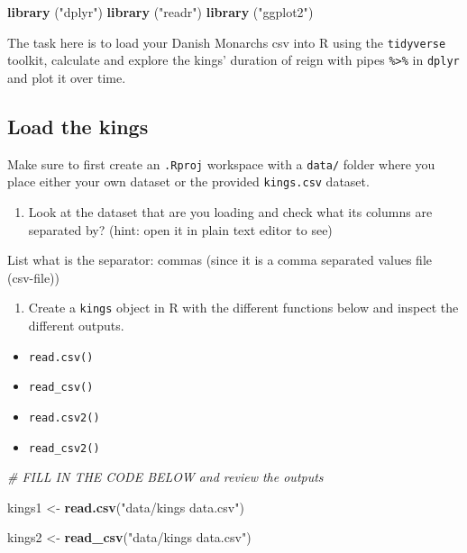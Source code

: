\documentclass[
]{article}
\newenvironment{Shaded}{\begin{snugshade}}{\end{snugshade}}
\newcommand{\CommentTok}[1]{\textcolor[rgb]{0.56,0.35,0.01}{\textit{#1}}}
\newcommand{\FunctionTok}[1]{\textcolor[rgb]{0.13,0.29,0.53}{\textbf{#1}}}
\newcommand{\NormalTok}[1]{#1}
\newcommand{\OtherTok}[1]{\textcolor[rgb]{0.56,0.35,0.01}{#1}}
\newcommand{\StringTok}[1]{\textcolor[rgb]{0.31,0.60,0.02}{#1}}
\providecommand{\tightlist}{%
  \setlength{\itemsep}{0pt}\setlength{\parskip}{0pt}}
\begin{document}
\begin{Shaded}
\begin{Highlighting}[]
\FunctionTok{library}\NormalTok{ (}\StringTok{"dplyr"}\NormalTok{)}
\FunctionTok{library}\NormalTok{ (}\StringTok{"readr"}\NormalTok{)}
\FunctionTok{library}\NormalTok{ (}\StringTok{"ggplot2"}\NormalTok{)}
\end{Highlighting}
\end{Shaded}

The task here is to load your Danish Monarchs csv into R using the
\texttt{tidyverse} toolkit, calculate and explore the kings' duration of
reign with pipes \texttt{\%\textgreater{}\%} in \texttt{dplyr} and plot
it over time.

\subsection{Load the kings}\label{load-the-kings}

Make sure to first create an \texttt{.Rproj} workspace with a
\texttt{data/} folder where you place either your own dataset or the
provided \texttt{kings.csv} dataset.

\begin{enumerate}
\def\labelenumi{\arabic{enumi}.}
\tightlist
\item
  Look at the dataset that are you loading and check what its columns
  are separated by? (hint: open it in plain text editor to see)
\end{enumerate}

List what is the separator: commas (since it is a comma separated values
file (csv-file))

\begin{enumerate}
\def\labelenumi{\arabic{enumi}.}
\setcounter{enumi}{1}
\tightlist
\item
  Create a \texttt{kings} object in R with the different functions below
  and inspect the different outputs.
\end{enumerate}

\begin{itemize}
\tightlist
\item
  \texttt{read.csv()}
\item
  \texttt{read\_csv()}
\item
  \texttt{read.csv2()}
\item
  \texttt{read\_csv2()}
\end{itemize}

\begin{Shaded}
\begin{Highlighting}[]
\CommentTok{\# FILL IN THE CODE BELOW and review the outputs}

\NormalTok{kings1 }\OtherTok{\textless{}{-}} \FunctionTok{read.csv}\NormalTok{(}\StringTok{"data/kings data.csv"}\NormalTok{)}

\NormalTok{kings2 }\OtherTok{\textless{}{-}} \FunctionTok{read\_csv}\NormalTok{(}\StringTok{"data/kings data.csv"}\NormalTok{)}
\end{Highlighting}
\end{Shaded}
\end{document}
